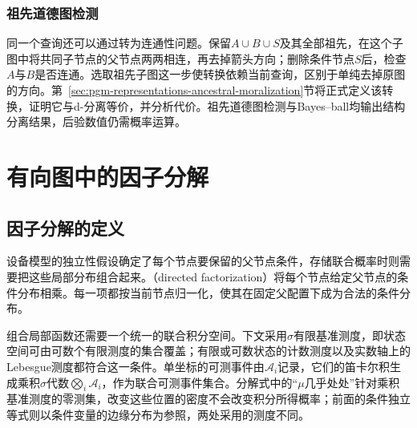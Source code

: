 \subsubsection{祖先道德图检测}
\label{sec:pgm-directed-ancestral-moral-test}
\label{sec:pgm-directed-undirected-test}

同一个查询还可以通过转为连通性问题。保留$A\cup B\cup S$及其全部祖先，在这个子图中将共同子节点的父节点两两相连，再去掉箭头方向；删除条件节点$S$后，检查$A$与$B$是否连通。选取祖先子图这一步使转换依赖当前查询，区别于单纯去掉原图的方向。第~\ref{sec:pgm-representations-ancestral-moralization}节将正式定义该转换，证明它与d-分离等价，并分析代价。祖先道德图检测与Bayes--ball均输出结构分离结果，后验数值仍需概率运算。

\endgroup

\section{有向图中的因子分解}
\label{sec:pgm-directed-factorization}

\subsection{因子分解的定义}
\label{sec:pgm-directed-factor-definition}

设备模型的独立性假设确定了每个节点要保留的父节点条件，存储联合概率时则需要把这些局部分布组合起来。（directed factorization）将每个节点给定父节点的条件分布相乘。每一项都按当前节点归一化，使其在固定父配置下成为合法的条件分布。

组合局部函数还需要一个统一的联合积分空间。下文采用$\sigma$有限基准测度，即状态空间可由可数个有限测度的集合覆盖；有限或可数状态的计数测度以及实数轴上的Lebesgue测度都符合这一条件。单坐标的可测事件由$\mathcal A_i$记录，它们的笛卡尔积生成乘积$\sigma$代数$\bigotimes_i\mathcal A_i$，作为联合可测事件集合。分解式中的“$\mu$几乎处处”针对乘积基准测度的零测集，改变这些位置的密度不会改变积分所得概率；前面的条件独立等式则以条件变量的边缘分布为参照，两处采用的测度不同。

